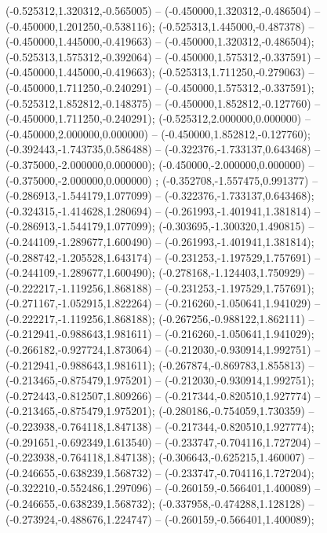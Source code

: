  (-0.525312,1.320312,-0.565005) -- (-0.450000,1.320312,-0.486504) -- (-0.450000,1.201250,-0.538116);
 (-0.525313,1.445000,-0.487378) -- (-0.450000,1.445000,-0.419663) -- (-0.450000,1.320312,-0.486504);
 (-0.525313,1.575312,-0.392064) -- (-0.450000,1.575312,-0.337591) -- (-0.450000,1.445000,-0.419663);
 (-0.525313,1.711250,-0.279063) -- (-0.450000,1.711250,-0.240291) -- (-0.450000,1.575312,-0.337591);
 (-0.525312,1.852812,-0.148375) -- (-0.450000,1.852812,-0.127760) -- (-0.450000,1.711250,-0.240291);
 (-0.525312,2.000000,0.000000) -- (-0.450000,2.000000,0.000000) -- (-0.450000,1.852812,-0.127760);
 (-0.392443,-1.743735,0.586488) -- (-0.322376,-1.733137,0.643468) -- (-0.375000,-2.000000,0.000000);
 (-0.450000,-2.000000,0.000000) -- (-0.375000,-2.000000,0.000000) ;
 (-0.352708,-1.557475,0.991377) -- (-0.286913,-1.544179,1.077099) -- (-0.322376,-1.733137,0.643468);
 (-0.324315,-1.414628,1.280694) -- (-0.261993,-1.401941,1.381814) -- (-0.286913,-1.544179,1.077099);
 (-0.303695,-1.300320,1.490815) -- (-0.244109,-1.289677,1.600490) -- (-0.261993,-1.401941,1.381814);
 (-0.288742,-1.205528,1.643174) -- (-0.231253,-1.197529,1.757691) -- (-0.244109,-1.289677,1.600490);
 (-0.278168,-1.124403,1.750929) -- (-0.222217,-1.119256,1.868188) -- (-0.231253,-1.197529,1.757691);
 (-0.271167,-1.052915,1.822264) -- (-0.216260,-1.050641,1.941029) -- (-0.222217,-1.119256,1.868188);
 (-0.267256,-0.988122,1.862111) -- (-0.212941,-0.988643,1.981611) -- (-0.216260,-1.050641,1.941029);
 (-0.266182,-0.927724,1.873064) -- (-0.212030,-0.930914,1.992751) -- (-0.212941,-0.988643,1.981611);
 (-0.267874,-0.869783,1.855813) -- (-0.213465,-0.875479,1.975201) -- (-0.212030,-0.930914,1.992751);
 (-0.272443,-0.812507,1.809266) -- (-0.217344,-0.820510,1.927774) -- (-0.213465,-0.875479,1.975201);
 (-0.280186,-0.754059,1.730359) -- (-0.223938,-0.764118,1.847138) -- (-0.217344,-0.820510,1.927774);
 (-0.291651,-0.692349,1.613540) -- (-0.233747,-0.704116,1.727204) -- (-0.223938,-0.764118,1.847138);
 (-0.306643,-0.625215,1.460007) -- (-0.246655,-0.638239,1.568732) -- (-0.233747,-0.704116,1.727204);
 (-0.322210,-0.552486,1.297096) -- (-0.260159,-0.566401,1.400089) -- (-0.246655,-0.638239,1.568732);
 (-0.337958,-0.474288,1.128128) -- (-0.273924,-0.488676,1.224747) -- (-0.260159,-0.566401,1.400089);
